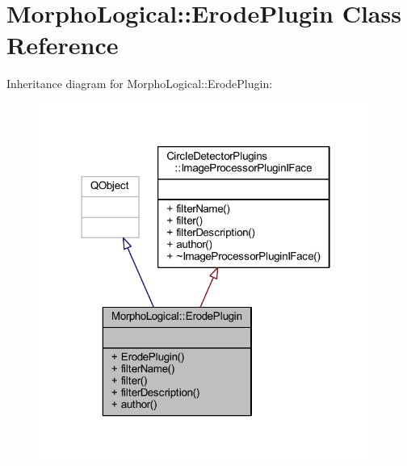 \hypertarget{class_morpho_logical_1_1_erode_plugin}{}\section{Morpho\+Logical\+:\+:Erode\+Plugin Class Reference}
\label{class_morpho_logical_1_1_erode_plugin}


Inheritance diagram for Morpho\+Logical\+:\+:Erode\+Plugin\+:\nopagebreak
\begin{figure}[H]
\begin{center}
\leavevmode
\includegraphics[width=310pt]{dc/dad/class_morpho_logical_1_1_erode_plugin__inherit__graph}
\end{center}
\end{figure}


